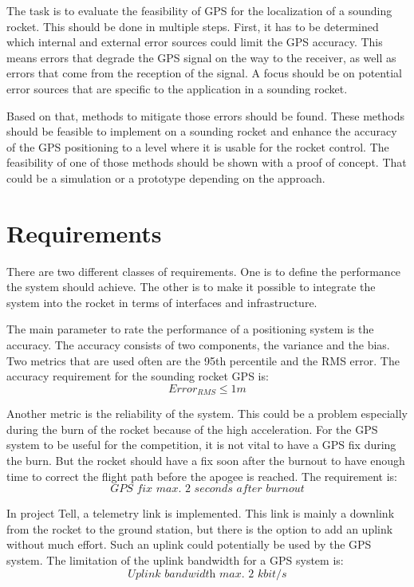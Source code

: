 The task is to evaluate the feasibility of GPS for the localization of a sounding rocket.
This should be done in multiple steps.
First, it has to be determined which internal and external error sources could limit the GPS accuracy.
This means errors that degrade the GPS signal on the way to the receiver, as well as errors that come from the reception of the signal.
A focus should be on potential error sources that are specific to the application in a sounding rocket.

Based on that, methods to mitigate those errors should be found.
These methods should be feasible to implement on a sounding rocket and enhance the accuracy of the GPS positioning to a level where it is usable for the rocket control.
The feasibility of one of those methods should be shown with a proof of concept.
That could be a simulation or a prototype depending on the approach.


\section{Requirements}\label{sec:requirements}

There are two different classes of requirements.
One is to define the performance the system should achieve.
The other is to make it possible to integrate the system into the rocket in terms of interfaces and infrastructure.

The main parameter to rate the performance of a positioning system is the accuracy.
The accuracy consists of two components, the variance and the bias.
Two metrics that are used often are the 95th percentile and the RMS error.
The accuracy requirement for the sounding rocket GPS is:
$$ Error_{RMS} \le 1 m $$

Another metric is the reliability of the system.
This could be a problem especially during the burn of the rocket because of the high acceleration.
For the GPS system to be useful for the competition, it is not vital to have a GPS fix during the burn.
But the rocket should have a fix soon after the burnout to have enough time to correct the flight path before the apogee is reached.
The requirement is:
$$ \textit{GPS fix max. 2 seconds after burnout} $$

In project Tell, a telemetry link is implemented.
This link is mainly a downlink from the rocket to the ground station, but there is the option to add an uplink without much effort.
Such an uplink could potentially be used by the GPS system.
The limitation of the uplink bandwidth for a GPS system is:
$$ \textit{Uplink bandwidth max. 2 kbit/s} $$